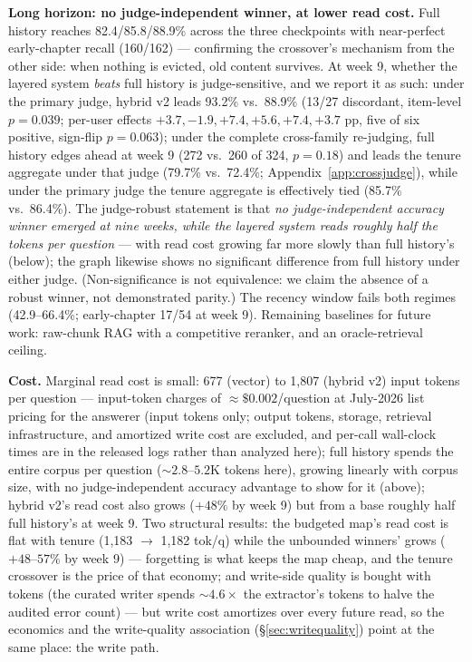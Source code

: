 \textbf{Long horizon: no judge-independent winner, at lower read cost.} Full
history reaches 82.4/85.8/88.9\% across the three checkpoints with
near-perfect early-chapter recall (160/162) --- confirming the crossover's
mechanism from the other side: when nothing is evicted, old content
survives. At week 9, whether the layered system \emph{beats} full history
is judge-sensitive, and we report it as such: under the primary judge,
hybrid v2 leads 93.2\% vs.\ 88.9\% (13/27 discordant, item-level $p=0.039$;
per-user effects $+3.7, -1.9, +7.4, +5.6, +7.4, +3.7$ pp, five of six
positive, sign-flip $p=0.063$); under the complete cross-family re-judging,
full history edges ahead at week 9 (272 vs.\ 260 of 324, $p=0.18$) and
leads the tenure aggregate under that judge (79.7\% vs.\ 72.4\%;
Appendix~\ref{app:crossjudge}), while under the primary judge the tenure
aggregate is effectively tied (85.7\% vs.\ 86.4\%). The judge-robust
statement is that \emph{no judge-independent accuracy winner emerged at
nine weeks, while the layered system reads roughly half the tokens per
question} --- with read cost growing far more slowly than full history's
(below); the graph likewise shows no significant difference from full
history under either judge. (Non-significance is not equivalence: we claim
the absence of a robust winner, not demonstrated parity.) The
recency window fails both regimes (42.9--66.4\%; early-chapter 17/54 at
week 9). Remaining baselines for future work: raw-chunk RAG with a
competitive reranker, and an oracle-retrieval ceiling.

\textbf{Cost.} Marginal read cost is small: 677 (vector) to 1{,}807
(hybrid v2) input tokens per question --- input-token charges of
${\approx}\$0.002$/question at July-2026 list pricing for the answerer
(input tokens only; output tokens, storage, retrieval infrastructure, and
amortized write cost are excluded, and per-call wall-clock times are in
the released logs rather than analyzed here); full history spends the
entire corpus per question (${\sim}2.8$--$5.2$K tokens here), growing
linearly with corpus size, with no judge-independent accuracy advantage to
show for it (above); hybrid v2's read cost also grows ($+48\%$ by week 9)
but from a base roughly half full history's at week 9. Two structural
results: the budgeted map's
read cost is flat with tenure (1{,}183 $\rightarrow$ 1{,}182 tok/q) while
the unbounded winners' grows ($+48$--$57\%$ by week 9) --- forgetting is
what keeps the map cheap, and the tenure crossover is the price of that
economy; and write-side quality is bought with tokens (the curated writer
spends ${\sim}4.6\times$ the extractor's tokens to halve the audited error
count) --- but write cost amortizes over every future read, so
the economics and the write-quality association
(\S\ref{sec:writequality}) point at the same place: the write path.
